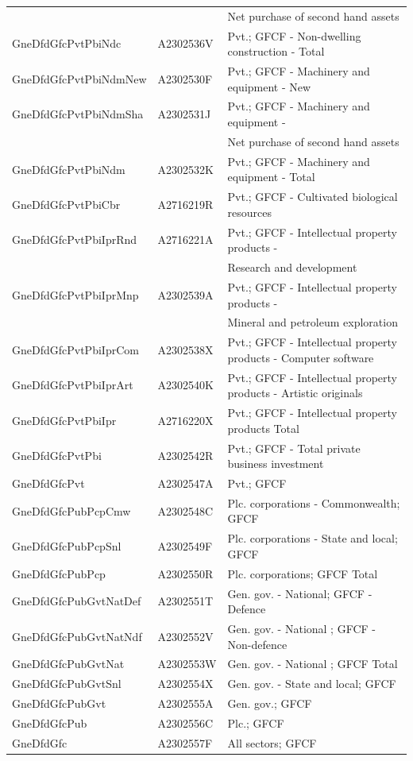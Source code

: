 \documentclass[a4paper, 11pt]{article}
\begin{document}
\begin{table}
\begin{tabular*}{\columnwidth}[width = \textwidth]{lll}
		&           & Net purchase of second hand \vphantom{1} assets\\
		\addlinespace
		GneDfdGfcPvtPbiNdc    & A2302536V & Pvt.; GFCF - Non-dwelling construction - Total\\
		GneDfdGfcPvtPbiNdmNew & A2302530F & Pvt.; GFCF - Machinery and equipment - New\\
		GneDfdGfcPvtPbiNdmSha & A2302531J & Pvt.; GFCF - Machinery and equipment -\\
		&           & Net purchase of second hand assets\\
		GneDfdGfcPvtPbiNdm    & A2302532K & Pvt.; GFCF - Machinery and equipment - Total\\
		\addlinespace
		GneDfdGfcPvtPbiCbr    & A2716219R & Pvt.; GFCF - Cultivated biological resources\\
		GneDfdGfcPvtPbiIprRnd & A2716221A & Pvt.; GFCF - Intellectual property products -\\
		&           & Research and development\\
		GneDfdGfcPvtPbiIprMnp & A2302539A & Pvt.; GFCF - Intellectual property products -\\
		&           & Mineral and petroleum exploration\\
		\addlinespace
		GneDfdGfcPvtPbiIprCom & A2302538X & Pvt.; GFCF - Intellectual property products - Computer software\\
		GneDfdGfcPvtPbiIprArt & A2302540K & Pvt.; GFCF - Intellectual property products - Artistic originals\\
		GneDfdGfcPvtPbiIpr    & A2716220X & Pvt.; GFCF - Intellectual property products Total\\
		GneDfdGfcPvtPbi       & A2302542R & Pvt.;  GFCF - Total private business investment\\
		GneDfdGfcPvt          & A2302547A & Pvt.; GFCF\\
		\addlinespace
		GneDfdGfcPubPcpCmw    & A2302548C & Plc. corporations - Commonwealth; GFCF\\
		GneDfdGfcPubPcpSnl    & A2302549F & Plc. corporations - State and local; GFCF\\
		GneDfdGfcPubPcp       & A2302550R & Plc. corporations; GFCF Total\\
		GneDfdGfcPubGvtNatDef & A2302551T & Gen. gov. - National; GFCF - Defence\\
		GneDfdGfcPubGvtNatNdf & A2302552V & Gen. gov. - National ; GFCF - Non-defence\\
		\addlinespace
		GneDfdGfcPubGvtNat    & A2302553W & Gen. gov. - National ; GFCF Total\\
		GneDfdGfcPubGvtSnl    & A2302554X & Gen. gov. - State and local; GFCF\\
		GneDfdGfcPubGvt       & A2302555A & Gen. gov.; GFCF\\
		GneDfdGfcPub          & A2302556C & Plc.; GFCF\\
		GneDfdGfc             & A2302557F & All sectors; GFCF\\
		\bottomrule
	\end{tabular*}
	\label{Tab:Expenditure-hierarchy-1}
\end{table}
\end{document}
